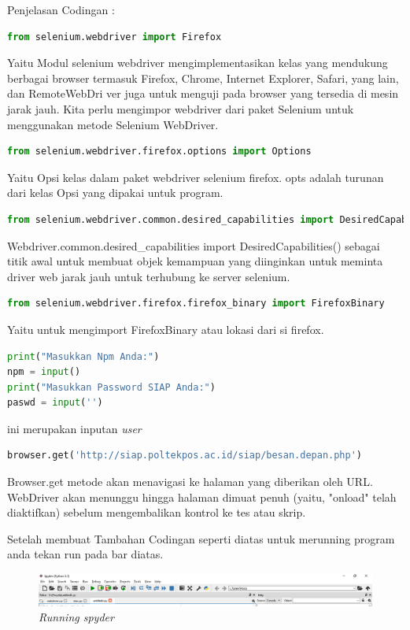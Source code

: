 Penjelasan Codingan :
\begin{lstlisting}[language=Python]
from selenium.webdriver import Firefox
\end{lstlisting}
Yaitu Modul selenium webdriver mengimplementasikan kelas yang mendukung berbagai browser termasuk Firefox, Chrome, Internet Explorer, Safari, yang lain, dan RemoteWebDri	ver juga untuk menguji pada browser yang tersedia di mesin jarak jauh. Kita perlu mengimpor webdriver dari paket Selenium untuk menggunakan metode Selenium WebDriver.

\begin{lstlisting}[language=Python]
from selenium.webdriver.firefox.options import Options
\end{lstlisting}
Yaitu Opsi kelas dalam paket webdriver selenium firefox. opts adalah turunan dari kelas Opsi yang dipakai untuk program.

\begin{lstlisting}[language=Python]
from selenium.webdriver.common.desired_capabilities import DesiredCapabilities
\end{lstlisting}
Webdriver.common.desired_capabilities import DesiredCapabilities()
sebagai titik awal untuk membuat objek kemampuan yang diinginkan untuk meminta driver web jarak jauh untuk terhubung ke server selenium.

\begin{lstlisting}[language=Python]
from selenium.webdriver.firefox.firefox_binary import FirefoxBinary
\end{lstlisting}
Yaitu untuk mengimport FirefoxBinary atau lokasi dari si firefox.

\begin{lstlisting}[language=Python]
print("Masukkan Npm Anda:")
npm = input()
print("Masukkan Password SIAP Anda:")
paswd = input('')

\end{lstlisting}
ini merupakan inputan \textit{user}

\begin{lstlisting}[language=Python]
browser.get('http://siap.poltekpos.ac.id/siap/besan.depan.php')
\end{lstlisting}
Browser.get metode akan menavigasi ke halaman yang diberikan oleh URL. WebDriver akan menunggu hingga halaman dimuat penuh (yaitu, "onload" telah diaktifkan) sebelum mengembalikan kontrol ke tes atau skrip.

\item Setelah membuat Tambahan Codingan  seperti diatas untuk merunning program anda tekan run pada bar diatas.
\begin{figure}[H]
    	\centering
    	\includegraphics[scale=0.3]{figures/run1.png}
    	\caption{\textit{Running spyder}}
    	\label{CLI}
	\end{figure}

